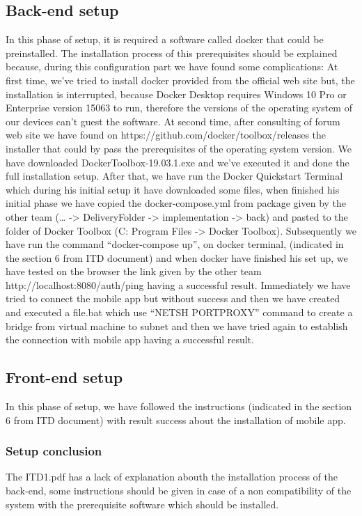\subsection{Back-end setup}
In this phase of setup, it is required a software called docker that could be preinstalled. The installation process of this prerequisites should be explained because, during this configuration part we have found some complications: 
At first time, we’ve tried to install docker provided from the official web site but, the installation is interrupted, because Docker Desktop requires Windows 10 Pro or Enterprise version 15063 to run, therefore the versions of the operating system of our devices can’t guest the software. At second time, after consulting of forum web site we have found on https://github.com/docker/toolbox/releases the installer that could by pass the prerequisites of the operating system version. We have downloaded DockerToolbox-19.03.1.exe and we’ve executed it and done the full installation setup. After that, we have run the Docker Quickstart Terminal which during his initial setup it have downloaded some files, when finished his initial phase we have copied the docker-compose.yml from package given by the other team (… -> DeliveryFolder -> implementation -> back) and pasted to the folder of Docker Toolbox (C: Program Files -> Docker Toolbox). Subsequently  we have run the command “docker-compose up”, on docker terminal, (indicated in the section 6 from ITD document) and when docker have finished his set up, we have tested on the browser the link given by the other team http://localhost:8080/auth/ping having a successful result.  Immediately we have tried to connect the mobile app but without success and then we have created and executed a file.bat which use “NETSH PORTPROXY” command to create a bridge from virtual machine to subnet and then we have tried again to establish the connection with mobile app having a successful result.

\subsection{Front-end setup}
In this phase of setup, we have followed the instructions (indicated in the section 6 from ITD document) with result success about the installation of mobile app.
\subsubsection{Setup conclusion}
The ITD1.pdf has a lack of explanation abouth the installation process of the back-end, some instructions should be given in case of a non compatibility of the system with the prerequisite software which should be installed.









